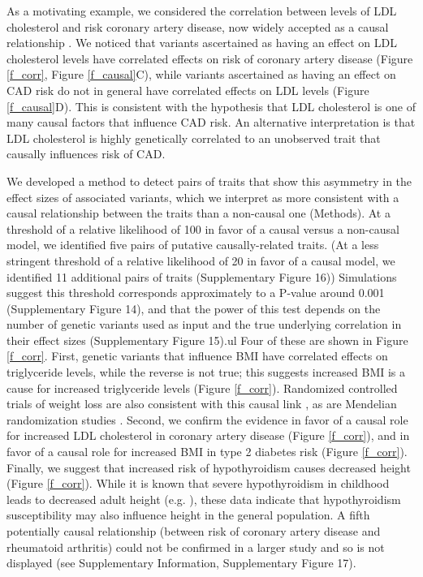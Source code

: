 \documentclass[11pt,titlepage]{article}
\begin{document}
As a motivating example, we considered the correlation between levels of LDL cholesterol and risk coronary artery disease, now widely accepted as a causal relationship \citep{:1994aa}. 
We noticed that variants ascertained as having an effect on LDL cholesterol levels have correlated effects on risk of coronary artery disease (Figure \ref{f_corr}, Figure \ref{f_causal}C), while variants ascertained as having an effect on CAD risk do not in general have correlated effects on LDL levels (Figure \ref{f_causal}D). 
This is consistent with the hypothesis that LDL cholesterol is one of many causal factors that influence CAD risk. 
An alternative interpretation is that LDL cholesterol is highly genetically correlated to an unobserved trait that causally influences risk of CAD. 

We developed a method to detect pairs of traits that show this asymmetry in the effect sizes of associated variants, which we interpret as more consistent with a causal relationship between the traits than a non-causal one (Methods).
At a threshold of a relative likelihood of 100 in favor of a causal versus a non-causal model, we identified five pairs of putative causally-related traits. 
(At a less stringent threshold of a relative likelihood of 20 in favor of a causal model, we identified 11 additional pairs of traits (Supplementary Figure 16))
Simulations suggest this threshold corresponds approximately to a P-value around 0.001 (Supplementary Figure 14), and that the power of this test depends on the number of genetic variants used as input and the true underlying correlation in their effect sizes (Supplementary Figure 15).ul
Four of these are shown in Figure \ref{f_corr}. 
First, genetic variants that influence BMI have correlated effects on triglyceride levels, while the reverse is not true; this suggests increased BMI is a cause for increased triglyceride levels (Figure \ref{f_corr}).
Randomized controlled trials of weight loss are also consistent with this causal link \citep{Look-AHEAD-Research-Group:2007aa, Shai:2008aa}, as are Mendelian randomization studies \citep{Wurtz:2014aa, Freathy:2008aa}.
Second, we confirm the evidence in favor of a causal role for increased LDL cholesterol in coronary artery disease (Figure \ref{f_corr}), and in favor of a causal role for increased BMI in type 2 diabetes risk (Figure \ref{f_corr}). 
Finally, we suggest that increased risk of hypothyroidism causes decreased height (Figure \ref{f_corr}). 
While it is known that severe hypothyroidism in childhood leads to decreased adult height (e.g. \citet{Rivkees:1988aa}), these data indicate that hypothyroidism susceptibility may also influence height in the general population.  
A fifth potentially causal relationship (between risk of coronary artery disease and rheumatoid arthritis) could not be confirmed in a larger study and so is not displayed (see Supplementary Information, Supplementary Figure 17).
\end{document}
